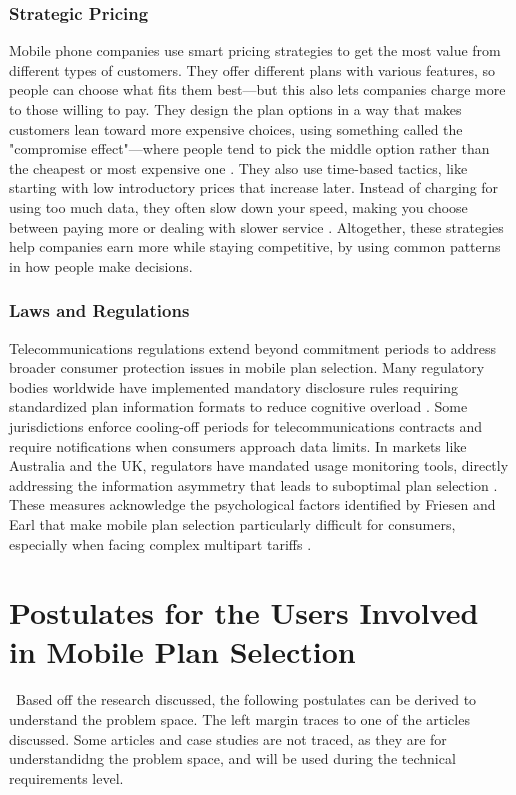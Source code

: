 \documentclass[conference]{IEEEtran}
\begin{document}
\subsubsection{Strategic Pricing}
Mobile phone companies use smart pricing strategies to get the most value from different types of customers. They offer different plans with various features, so people can choose what fits them best—but this also lets companies charge more to those willing to pay. They design the plan options in a way that makes customers lean toward more expensive choices, using something called the "compromise effect"—where people tend to pick the middle option rather than the cheapest or most expensive one \cite{b3}. They also use time-based tactics, like starting with low introductory prices that increase later. Instead of charging for using too much data, they often slow down your speed, making you choose between paying more or dealing with slower service \cite{b1}. Altogether, these strategies help companies earn more while staying competitive, by using common patterns in how people make decisions.
\subsubsection{Laws and Regulations}
Telecommunications regulations extend beyond commitment periods to address broader consumer protection issues in mobile plan selection. Many regulatory bodies worldwide have implemented mandatory disclosure rules requiring standardized plan information formats to reduce cognitive overload \cite{b3}. Some jurisdictions enforce cooling-off periods for telecommunications contracts and require notifications when consumers approach data limits. In markets like Australia and the UK, regulators have mandated usage monitoring tools, directly addressing the information asymmetry that leads to suboptimal plan selection \cite{b6}. These measures acknowledge the psychological factors identified by Friesen and Earl that make mobile plan selection particularly difficult for consumers, especially when facing complex multipart tariffs \cite{b1}.
\section{Postulates for the Users Involved in Mobile Plan Selection}\
Based off the research discussed, the following postulates can be derived to understand the problem space. The left margin traces to one of the articles discussed. Some articles and case studies are not traced, as they are for understandidng the problem space, and will be used during the technical requirements level. 
\end{document}
